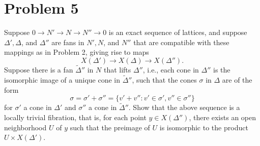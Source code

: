 \documentclass[12pt, a4paper]{article}
\begin{document}
\section*{Problem 5}
Suppose $0 \to N' \to N \to N'' \to 0$ is an exact sequence of lattices, and suppose $\Delta', \Delta$, and $\Delta''$ are fans in $N', N$, and $N''$ that are compatible with these mappings as in Problem 2, giving rise to maps
\[
X(\Delta') \to X(\Delta) \to X(\Delta'').
\]
Suppose there is a fan $\widetilde{\Delta}''$ in $N$ that lifts $\Delta''$, i.e., each cone in $\Delta''$ is the isomorphic image of a unique cone in $\widetilde{\Delta}''$, such that the cones $\sigma$ in $\Delta$ are of the form
\[
\sigma = \sigma' + \sigma'' = \{v' + v'' : v' \in \sigma', v'' \in \sigma''\}
\]
for $\sigma'$ a cone in $\Delta'$ and $\sigma''$ a cone in $\widetilde{\Delta}''$. Show that the above sequence is a locally trivial fibration, that is, for each point $y \in X(\Delta'')$, there exists an open neighborhood $U$ of $y$ such that the preimage of $U$ is isomorphic to the product $U \times X(\Delta')$.
\end{document}
